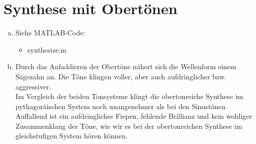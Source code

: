\chapter{Synthese mit Obertönen}


\begin{enumerate}[a)]
\item
Siehe MATLAB-Code:
\begin{itemize}
\item
synthesize.m
\end{itemize}
\item
Durch das Aufaddieren der Obertöne nähert sich die Wellenform einem Sägezahn an. Die Töne klingen voller, aber auch aufdringlicher bzw. aggressiver.\\
Im Vergleich der beiden Tonsysteme klingt die obertonreiche Synthese im pythagoräischen System noch unangenehmer als bei den Sinustönen. Auffallend ist ein aufdringliches Fiepen, fehlende Brillianz und kein wohliger Zusammenklang der Töne, wie wir es bei der obertonreichen Synthese im gleichstufigen System hören können.\\
\end{enumerate}
